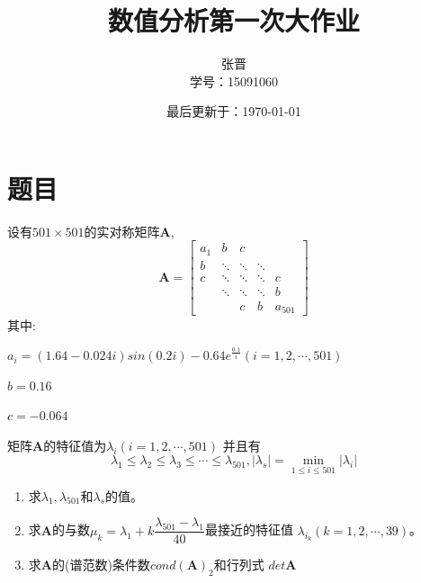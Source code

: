
\usepackage{listings}
\usepackage{algorithm}
\usepackage{amsmath,bm}
\usepackage{algorithmic}
\title{数值分析第一次大作业}
\author{张晋\\学号：15091060}
\date{最后更新于：\today}


\maketitle

\tableofcontents


\newpage

\chapter{题目}
设有$501\times501$的实对称矩阵$\bm{A}$,
\[\bm{A}=\left[ {\begin{array}{*{20}{c}}
a_1&b&c&{}&{}\\
b& \ddots& \ddots& \ddots &{}\\
c& \ddots& \ddots& \ddots &c\\
{}& \ddots& \ddots& \ddots &b\\
{}&{}& c& b&{a_{501}}
\end{array}} \right]\]
其中:

$a_i=(1.64-0.024i)sin(0.2i)-0.64e^{\frac{0.1}{i}}
(i=1,2,\cdots,501)$

$b=0.16$

$c=-0.064$

矩阵$\bm{A}$的特征值为$\lambda_i(i=1,2,\cdots,501)$
并且有
\[{\lambda _1} \le {\lambda _2} \le {\lambda _3} \le  \cdots  \le {\lambda _{501}},\left| {{\lambda _s}} \right| = \mathop {\min }\limits_{1 \le i \le 501} \left| {{\lambda _i}} \right|\]

\begin{enumerate}
\item 求$\lambda _1,\lambda _{501}$和$\lambda_s$的值。
\item 求$\bm{A}$的与数${\mu _{k}} = {\lambda _1} + k\dfrac{{{\lambda _{501}} - {\lambda _1}}}{{40}}$最接近的特征值
${\lambda _{{i_k}}}(k=1,2,\cdots,39)$。
\item 求$\bm{A}$的(谱范数)条件数$cond(\bm{A})_2$和行列式
$det\bm{A}$

\end{enumerate}
\newpage
